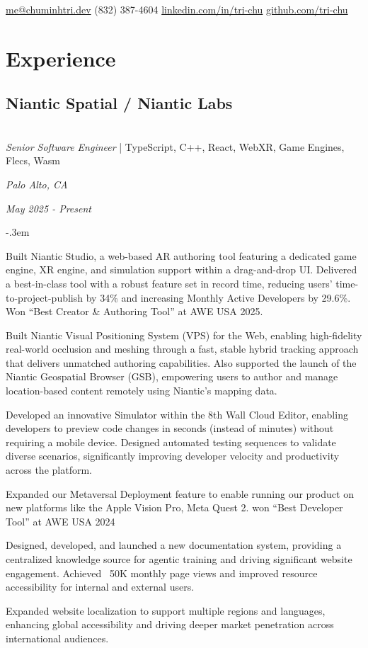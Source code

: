 \documentclass{article}
\makeatletter
\def\faEmail{{\FAFR \symbol{"F0E0}}} %
\def\faPhone{{\FAFR \symbol{"F095}}} %
\def\faLinkedin{{\FAB \symbol{"F08C}}} %
\def\faGithub{{\FAB \symbol{"F09B}}} %
\let\olditemize=\itemize \let\endolditemize=\enditemize
\renewenvironment{itemize}{\olditemize[topsep=0em] \itemsep-.3em}{\endolditemize}
\newcommand{\link}[1]{\href{https://#1}{#1}}
\newenvironment{twocolentry}[2][]{
    \def\secondColumn{#2}
    \raggedright
    \setcolumnwidth{\fill, 6cm}
    \begin{paracol}{2}
}{
    \switchcolumn \raggedleft \secondColumn
    \end{paracol}
} %
\renewcommand{\maketitle}{
  \begin{flushleft}
    \Huge\bfseries\theauthor
  \end{flushleft}
  \begin{bfseries}
    \faEmail    \hspace{1pt} \href{mailto:me@chuminhtri.dev}{me@chuminhtri.dev} \quad
    \faPhone    \hspace{1pt} (832) 387-4604 \quad
    \faLinkedin \hspace{1pt} \link{linkedin.com/in/tri-chu} \quad
    \faGithub   \hspace{1pt} \link{github.com/tri-chu}
  \end{bfseries}
}
\makeatother
\begin{document}
\author{\color{accentcolor}Tri Chu}
\maketitle


\section{Experience}

\begin{twocolentry}{
  \textit{Palo Alto, CA}

  \textit{May 2025 - Present}
}
\subsection{Niantic Spatial / Niantic Labs}\hfill\\

\textit{Senior Software Engineer} | TypeScript, C++, React, WebXR, Game Engines, Flecs, Wasm 
\end{twocolentry}

\begin{itemize}
  \item Built Niantic Studio, a web-based AR authoring tool featuring a dedicated game engine, XR
  engine, and simulation support within a drag-and-drop UI. Delivered a best-in-class tool with a
  robust feature set in record time, reducing users’ time-to-project-publish by 34\% and increasing
  Monthly Active Developers by 29.6\%. Won “Best Creator & Authoring Tool” at AWE USA 2025.
  \item Built Niantic Visual Positioning System (VPS) for the Web, enabling high-fidelity real-world
  occlusion and meshing through a fast, stable hybrid tracking approach that delivers unmatched
  authoring capabilities. Also supported the launch of the Niantic Geospatial Browser (GSB),
  empowering users to author and manage location-based content remotely using Niantic’s mapping
  data.
  \item Developed an innovative Simulator within the 8th Wall Cloud Editor, enabling developers to
  preview code changes in seconds (instead of minutes) without requiring a mobile device. Designed
  automated testing sequences to validate diverse scenarios, significantly improving developer
  velocity and productivity across the platform.
  \item Expanded our Metaversal Deployment feature to enable running our product on new platforms
  like the Apple Vision Pro, Meta Quest 2. won “Best Developer Tool” at AWE USA 2024
  \item Designed, developed, and launched a new documentation system, providing a centralized
  knowledge source for agentic training and driving significant website engagement. Achieved ~50K
  monthly page views and improved resource accessibility for internal and external users.
  \item Expanded website localization to support multiple regions and languages, enhancing global
  accessibility and driving deeper market penetration across international audiences.
\end{itemize}
\end{document}
